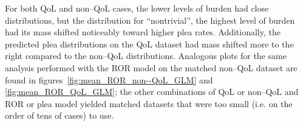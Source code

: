 For both QoL and non--QoL cases,
the lower levels of burden had close distributions,
but the distribution for ``nontrivial'',
the highest level of burden had its mass shifted noticeably toward higher plea rates.
Additionally,
the predicted plea distributions on the QoL dataset had mass shifted more to the right compared to the non--QoL distributions.
Analogous plots for the same analysis performed with the ROR model on the matched non--QoL dataset are found in
figures~\ref{fig:mean_ROR_non--QoL_GLM} and
        \ref{fig:mean_ROR_QoL_GLM};
the other combinations of QoL or non--QoL and ROR or plea model yielded matched datasets that were too small
(i.e. on the order of tens of cases) to use.







